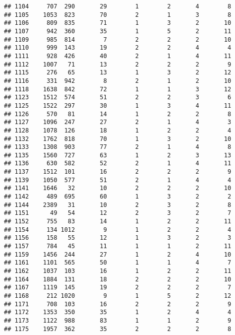 \documentclass[]{article}
\begin{document}
\begin{verbatim}
## 1104     707  290       29        1        2       4        8
## 1105    1053  823       70        2        1       3        8
## 1106     809  835       71        1        3       2       10
## 1107     942  360       35        1        5       2       11
## 1109     985  814        7        2        2       2       10
## 1110     999  143       19        2        2       4        4
## 1111     928  426       40        2        1       4       11
## 1112    1007   71       13        2        2       2        9
## 1115     276   65       13        1        3       2       12
## 1116     331  942        8        2        1       2       10
## 1118    1638  842       72        1        1       3       12
## 1123    1512  574       51        2        2       3        6
## 1125    1522  297       30        1        3       4       11
## 1126     570   81       14        1        2       2        8
## 1127    1096  247       27        2        1       4        3
## 1128    1078  126       18        1        2       2        4
## 1132    1762  818       70        1        3       2       10
## 1133    1308  903       77        2        1       4        8
## 1135    1560  727       63        1        2       3       13
## 1136     630  582       52        2        1       4       11
## 1137    1512  101       16        2        2       2        9
## 1139    1050  577       51        2        1       4        4
## 1141    1646   32       10        2        2       2       10
## 1142     489  695       60        1        3       2        2
## 1144    2389   31       10        2        3       2        8
## 1151      49   54       12        2        3       2        7
## 1152     755   83       14        1        2       2       11
## 1154     134 1012        9        1        2       2        4
## 1156     158   55       12        1        3       2        3
## 1157     784   45       11        1        1       2       11
## 1159    1456  244       27        1        2       4       10
## 1161    1101  565       50        1        1       4        7
## 1162    1037  103       16        1        2       2       11
## 1164    1884  131       18        2        2       2       10
## 1167    1119  145       19        2        2       2        7
## 1168     212 1020        9        1        5       2       12
## 1171     708  103       16        2        2       2        9
## 1172    1353  350       35        1        2       4        4
## 1173    1122  988       83        1        1       2        9
## 1175    1957  362       35        2        2       2        8

\end{verbatim}
\end{document}

